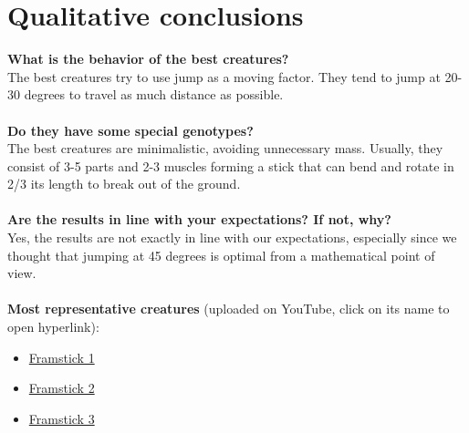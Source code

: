\documentclass[a4]{article}
\begin{document}
\section{Qualitative conclusions}
\textbf{What is the behavior of the best creatures?} \\
The best creatures try to use jump as a moving factor. They tend to jump at 20-30 degrees to travel as much distance as possible. \\
\\
\textbf{Do they have some special genotypes?} \\
The best creatures are minimalistic, avoiding unnecessary mass. Usually, they consist of 3-5 parts and 2-3 muscles forming a stick that can bend and rotate in 2/3 its length to break out of the ground. \\
\\
\textbf{Are the results in line with your expectations? If not, why?} \\
Yes, the results are not exactly in line with our expectations, especially since we thought that jumping at 45 degrees is optimal from a mathematical point of view. \\ \\
\textbf{Most representative creatures} (uploaded on YouTube, click on its name to open hyperlink):
\begin{itemize}
	\item \href{https://youtu.be/IhmRtiFgemY}{Framstick 1}
	\item \href{https://youtu.be/7Hn87hwG9KA}{Framstick 2}
	\item \href{https://youtu.be/XFscjOizwvY}{Framstick 3}
\end{itemize}
\listoffigures
\end{document}
